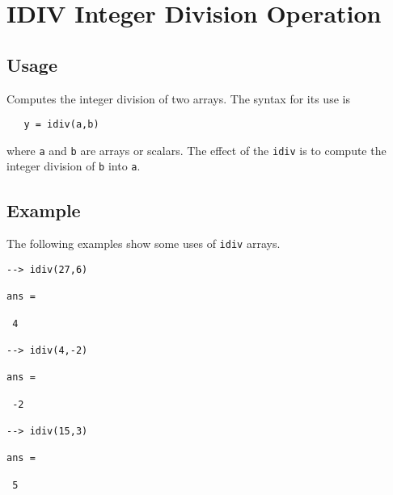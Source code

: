\section{IDIV Integer Division Operation}

\subsection{Usage}

Computes the integer division of two arrays.  The syntax for its use is
\begin{verbatim}
   y = idiv(a,b)
\end{verbatim}
where \verb|a| and \verb|b| are arrays or scalars.  The effect of the \verb|idiv|
is to compute the integer division of \verb|b| into \verb|a|.
\subsection{Example}

The following examples show some uses of \verb|idiv|
arrays.
\begin{verbatim}
--> idiv(27,6)

ans = 

 4 

--> idiv(4,-2)

ans = 

 -2 

--> idiv(15,3)

ans = 

 5 
\end{verbatim}
